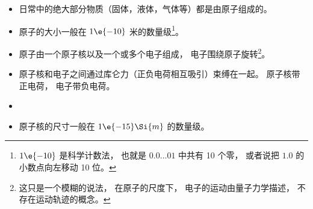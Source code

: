 
\begin{issues}
\issueDraft
\end{issues}

\begin{itemize}
\item 日常中的绝大部分物质（固体，液体，气体等）都是由原子组成的。
\item 原子的大小一般在 $1\e{-10}$ 米的数量级\footnote{$1\e{-10}$ 是科学计数法， 也就是 $0.0\dots01$ 中共有 10 个零， 或者说把 $1.0$ 的小数点向左移动 10 位。}。
\item 原子由一个原子核以及一个或多个电子组成， 电子围绕原子旋转\footnote{这只是一个模糊的说法， 在原子的尺度下， 电子的运动由量子力学描述， 不存在运动轨迹的概念。}。
\item 原子核和电子之间通过库仑力（正负电荷相互吸引）束缚在一起。 原子核带正电荷， 电子带负电荷。
\item 

\item 原子核的尺寸一般在 $1\e{-15}\Si{m}$ 的数量级。
\end{itemize}
